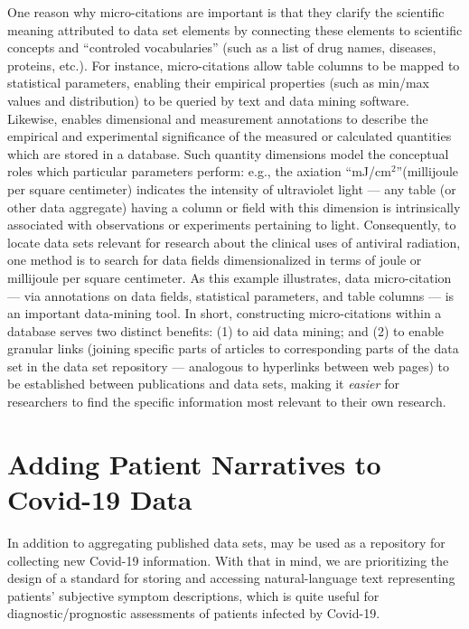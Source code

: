 \documentclass[11pt,letterpaper]{article}
\newcommand{\UV}{\resizebox{!}{7pt}{\AcronymText{UV}}}
\newcommand{\textscc}[1]{{\color{orr!35!black}{{%
						\fontfamily{Cabin-TLF}\fontseries{b}\selectfont{\textsc{\scriptsize{#1}}}}}}}
\newcommand{\AcronymText}[1]{{\textscc{#1}}}
\newcommand{\CRtwo}{{\resizebox{!}{7pt}{\AcronymText{CR2}}}}
\newcommand{\p}[1]{

\vspace{.7em}#1}
\newcommand{\q}[1]{{\fontfamily{qcr}\selectfont ``}#1{\fontfamily{qcr}\selectfont ''}}
\begin{document}
{%

\p{One reason why micro-citations are important is that they 
clarify the scientific meaning attributed to data set  
elements by connecting these elements to scientific concepts and 
\q{controled vocabularies} (such as a list of drug names, 
diseases, proteins, etc.).  
For instance, micro-citations allow table columns to be 
mapped to statistical parameters, enabling their 
empirical properties (such as min/max values and distribution) 
to be queried by text and data mining software.  Likewise, 
\CRtwo{} enables dimensional 
and measurement annotations to describe the empirical and experimental 
significance of the measured or calculated quantities which 
are stored in a database.  Such quantity dimensions model the 
conceptual roles which particular parameters perform: 
e.g., the axiation \q{mJ/cm$^2$}(millijoule per 
square centimeter) indicates the intensity of 
ultraviolet light --- any table (or other 
data aggregate) having a column or field with this dimension 
is intrinsically associated with observations or experiments 
pertaining to \UV{} light.  Consequently, to 
locate data sets relevant for research about the clinical uses of 
antiviral \UV{} radiation, 
one method is to search for data fields dimensionalized 
in terms of joule or millijoule per square centimeter.  
As this example illustrates, data micro-citation 
--- via annotations on data fields, statistical parameters, 
and table columns --- is an important data-mining tool.  
In short, constructing micro-citations within a database 
serves two distinct benefits: (1) to aid data mining; and 
(2) to enable granular links (joining specific 
parts of articles to corresponding parts of the data set in 
the data set repository --- analogous to hyperlinks 
between web pages) to be established between 
publications and data sets, making it \textit{easier} for 
researchers to find the specific information most 
relevant to their own research.}

\section{Adding Patient Narratives to Covid-19 Data}

\p{In addition to aggregating published data sets, \CRtwo{} 
may be used as a repository for collecting new Covid-19 
information.  With that in mind, we are prioritizing the 
design of a standard for storing and accessing 
natural-language text representing patients' subjective 
symptom descriptions, which is quite useful for 
diagnostic/prognostic assessments of patients 
infected by Covid-19.}

}
\end{document}
